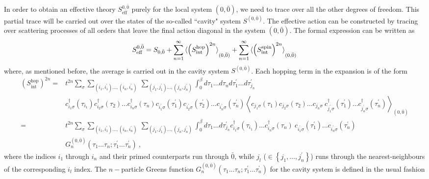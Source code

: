 \documentclass[reprint,hidelinks]{revtex4-2}
\begin{document}
\begin{widetext}
In order to obtain an effective theory \(S^{0,{\bar 0}}_\text{eff}\) purely for the local system \((0,{\bar 0})\), we need to trace over all the other degrees of freedom. This partial trace will be carried out over the states of the so-called ``cavity" system \(S^{(0,{\bar 0})}\). The effective action can be constructed by tracing over scattering processes of all orders that leave the final action diagonal in the system \((0,{\bar 0})\). The formal expression can be written as
\begin{equation}\begin{aligned}
	S^{0,{\bar 0}}_\text{eff} = S_{0,{\bar 0}} + \sum_{n=1}^\infty \braket{\left(S_\text{int}^\text{hop}\right)^{2n}}_{(0,{\bar 0})} + \sum_{n=1}^\infty \braket{\left(S_\text{int}^\text{spin}\right)^{2n}}_{(0,{\bar 0})}
\end{aligned}\end{equation}
where, as mentioned before, the average is carried out in the cavity system \(S^{(0,{\bar 0})}\). Each hopping term in the expansion is of the form
\begin{equation}\begin{aligned}
	\left(S_\text{int}^\text{hop}\right)^{2n} =& t^{2n}\sum_\sigma\sum_{(i_1, i_1^\prime)\ldots, (i_n, i_n^\prime)} ~\sum_{(j_1, j_1^\prime)\ldots, (j_n, j_n^\prime)} \int_0^\beta d\tau_{1}\ldots d\tau_{n}d\tau_{1}^\prime\ldots d\tau_{j_n}^\prime\\
			   &c^\dagger_{i_1\sigma}(\tau_{i_1})c^\dagger_{i_2\sigma}(\tau_{2})\ldots c^\dagger_{i_n\sigma}(\tau_{n}) c_{i_1^\prime\sigma}(\tau_{1}^\prime)c_{i_2^\prime\sigma}(\tau_{2}^\prime)\ldots c_{i_n^\prime\sigma}(\tau_{n}^\prime)\left<c_{j_1\sigma}(\tau_{1})c_{j_2\sigma}(\tau_{2})\ldots c_{j_n\sigma} ~ c^\dagger_{j_1^\prime\sigma}(\tau_{1}^\prime)\ldots c^\dagger_{j_n^\prime\sigma}(\tau_{n}^\prime) \right>_{(0,{\bar 0})}\\
	=& t^{2n}\sum_\sigma\sum_{(i_1, i_1^\prime)\ldots, (i_n, i_n^\prime)} ~\sum_{(j_1, j_1^\prime)\ldots, (j_n, j_n^\prime)} \int_0^\beta d\tau_{1}\ldots d\tau_{j_n}^\prime c^\dagger_{i_1\sigma}(\tau_{i_1})\ldots c^\dagger_{i_n\sigma}(\tau_{n})~c_{i_1^\prime\sigma}(\tau_{1}^\prime)\ldots c_{i_n^\prime\sigma}(\tau_{n}^\prime)\\
	 &G_n^{(0,\bar 0)}\left(\tau_1\ldots \tau_n; \tau_1^\prime\ldots \tau_n^\prime\right)~,
\end{aligned}\end{equation}
where the indices \(i_1\) through \(i_n\) and their primed counterparts run through \(\bar 0\), while \(j_l\) (\(\in \left\{j_1,\ldots,j_n^\prime\right\}\)) runs through the nearest-neighbours of the corresponding \(i_l\) index. The \(n-\)particle Greens function \(G_n^{(0,\bar 0)}\left(\tau_1\ldots \tau_n; \tau_1^\prime\ldots \tau_n^\prime\right)\) for the cavity system is defined in the usual fashion

\end{widetext}
\end{document}
